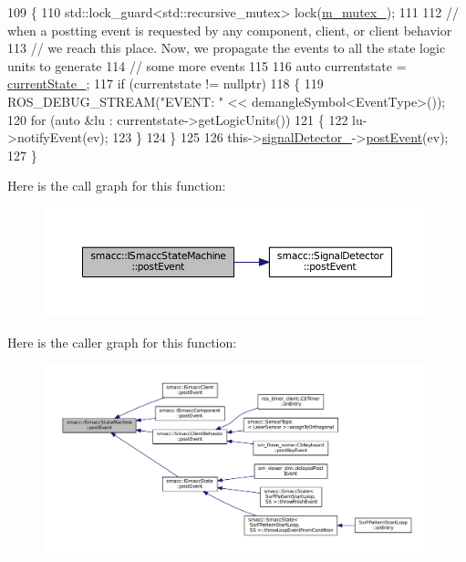\begin{DoxyCode}
109 \{
110     std::lock\_guard<std::recursive\_mutex> lock(\hyperlink{classsmacc_1_1ISmaccStateMachine_aac785541646e5c517273bf31072505a1}{m\_mutex\_});
111 
112     \textcolor{comment}{// when a postting event is requested by any component, client, or client behavior}
113     \textcolor{comment}{// we reach this place. Now, we propagate the events to all the state logic units to generate}
114     \textcolor{comment}{// some more events}
115 
116     \textcolor{keyword}{auto} currentstate = \hyperlink{classsmacc_1_1ISmaccStateMachine_a9c6e7745205bcce80a301f2fbe8f7e99}{currentState\_};
117     \textcolor{keywordflow}{if} (currentstate != \textcolor{keyword}{nullptr})
118     \{
119         ROS\_DEBUG\_STREAM(\textcolor{stringliteral}{"EVENT: "} << demangleSymbol<EventType>());
120         \textcolor{keywordflow}{for} (\textcolor{keyword}{auto} &lu : currentstate->getLogicUnits())
121         \{
122             lu->notifyEvent(ev);
123         \}
124     \}
125 
126     this->\hyperlink{classsmacc_1_1ISmaccStateMachine_a3982eb671f5f001cb047d3a467789986}{signalDetector\_}->\hyperlink{classsmacc_1_1SignalDetector_a6ab99d99cef8d101e39797a72daeb2b7}{postEvent}(ev);
127 \}
\end{DoxyCode}


Here is the call graph for this function\+:
\nopagebreak
\begin{figure}[H]
\begin{center}
\leavevmode
\includegraphics[width=350pt]{classsmacc_1_1ISmaccStateMachine_ad80cdd7bbc9a9f3b221c625754fed1ed_cgraph}
\end{center}
\end{figure}




Here is the caller graph for this function\+:
\nopagebreak
\begin{figure}[H]
\begin{center}
\leavevmode
\includegraphics[width=350pt]{classsmacc_1_1ISmaccStateMachine_ad80cdd7bbc9a9f3b221c625754fed1ed_icgraph}
\end{center}
\end{figure}


